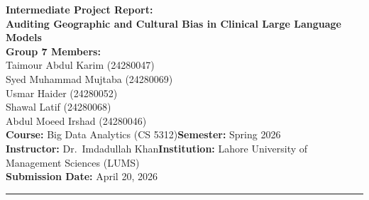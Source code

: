 \documentclass[11pt,a4paper]{article}
\begin{document}
\graphicspath{{figs/}}

\begin{center}
{\Large\textbf{Intermediate Project Report:\\[0.2em]
Auditing Geographic and Cultural Bias in Clinical Large Language Models}}\\[1.0em]

\textbf{Group 7 Members:}\\[0.3em]
Taimour Abdul Karim (24280047)\\
Syed Muhammad Mujtaba (24280069)\\
Usmar Haider (24280052)\\
Shawal Latif (24280068)\\
Abdul Moeed Irshad (24280046)\\[0.8em]

\textbf{Course:} Big Data Analytics (CS 5312)\qquad\textbf{Semester:} Spring 2026\\
\textbf{Instructor:} Dr.\ Imdadullah Khan\qquad\textbf{Institution:} Lahore University of Management Sciences (LUMS)\\
\textbf{Submission Date:} April 20, 2026
\end{center}

\vspace{0.8em}\hrule\vspace{0.8em}
\end{document}
